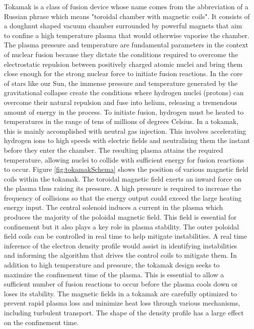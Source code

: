 Tokamak is a class of fusion device whose name comes from the abbreviation of a Russian phrase which means "toroidal chamber with magnetic coils". It consists of a doughnut shaped vacuum chamber surrounded by powerful magnets that aim to confine a high temperature plasma that would otherwise vaporise the chamber. The plasma pressure and temperature are fundamental parameters in the context of nuclear fusion because they dictate the conditions required to overcome the electrostatic repulsion between positively charged atomic nuclei and bring them close enough for the strong nuclear force to initiate fusion reactions. In the core of stars like our Sun, the immense pressure and temperature generated by the gravitational collapse create the conditions where hydrogen nuclei (protons) can overcome their natural repulsion and fuse into helium, releasing a tremendous amount of energy in the process. To initiate fusion, hydrogen must be heated to temperatures in the range of tens of millions of degrees Celsius. In a tokamak, this is mainly accomplished with neutral gas injection. This involves accelerating hydrogen ions to high speeds with electric fields and neutralising them the instant before they enter the chamber. The resulting plasma attains the required temperature, allowing nuclei to collide with sufficient energy for fusion reactions to occur. Figure \ref{fig:tokamakSchema} shows the position of various magnetic field coils within the tokamak. The toroidal magnetic field exerts an inward force on the plasma thus raising its pressure. A high pressure is required to increase the frequency of collisions so that the energy output could exceed the large heating energy input. The central solenoid induces a current in the plasma which produces the majority of the poloidal magnetic field. This field is essential for confinement but it also plays a key role in plasma stability. The outer poloidal field coils can be controlled in real time to help mitigate instabilities. A real time inference of the electron density profile would assist in identifying instabilities and informing the algorithm that drives the control coils to mitigate them. In addition to high temperature and pressure, the tokamak design seeks to maximize the confinement time of the plasma. This is essential to allow a sufficient number of fusion reactions to occur before the plasma cools down or loses its stability. The magnetic fields in a tokamak are carefully optimized to prevent rapid plasma loss and minimize heat loss through various mechanisms, including turbulent transport. The shape of the density profile has a large effect on the confinement time.

